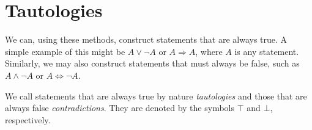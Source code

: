 \section{Tautologies}

We can, using these methods, construct statements that are always true.
A simple example of this might be \(A \lor \neg A\) or \(A \Rightarrow A\),
where \(A\) is any statement. Similarly, we may also construct statements that
must always be false, such as \(A \land \neg A\) or \(A \Leftrightarrow \neg A\).

We call statements that are always true by nature \emph{tautologies} and
those that are always false \emph{contradictions}. They are denoted by the
symbols \(\top\) and \(\bot\), respectively.


